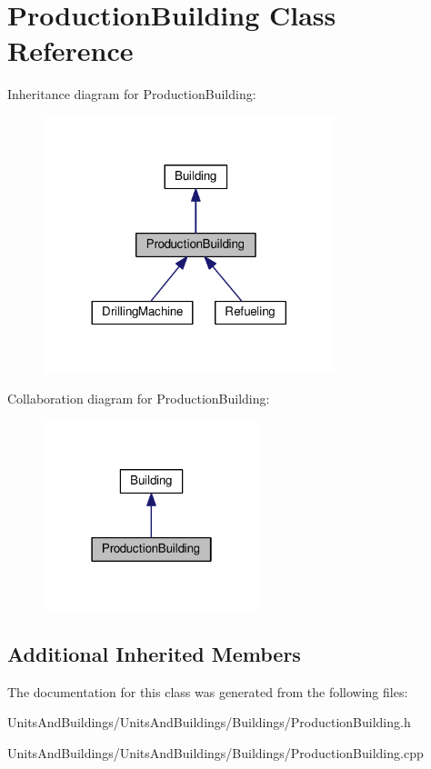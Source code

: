 \hypertarget{class_production_building}{}\section{Production\+Building Class Reference}
\label{class_production_building}


Inheritance diagram for Production\+Building\+:
\nopagebreak
\begin{figure}[H]
\begin{center}
\leavevmode
\includegraphics[width=240pt]{class_production_building__inherit__graph}
\end{center}
\end{figure}


Collaboration diagram for Production\+Building\+:
\nopagebreak
\begin{figure}[H]
\begin{center}
\leavevmode
\includegraphics[width=178pt]{class_production_building__coll__graph}
\end{center}
\end{figure}
\subsection*{Additional Inherited Members}


The documentation for this class was generated from the following files\+:\begin{DoxyCompactItemize}
\item 
Units\+And\+Buildings/\+Units\+And\+Buildings/\+Buildings/Production\+Building.\+h\item 
Units\+And\+Buildings/\+Units\+And\+Buildings/\+Buildings/Production\+Building.\+cpp\end{DoxyCompactItemize}
